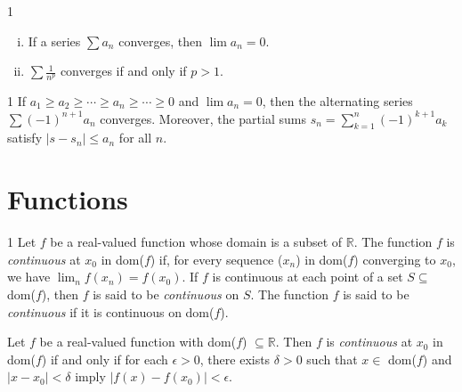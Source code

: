 \newpage

\begin{theo}{1}
	\begin{enumerate}[(i)]
		\item If a series $\sum a_n$ converges, then $\lim a_n = 0$. 
		\item $\sum \frac{1}{n^p}$ converges if and only if $p > 1$. 
	\end{enumerate}
\end{theo}



\begin{theo}{1}
	If $a_1 \geq a_2 \geq \cdots \geq a_n \geq \cdots \geq 0$ and $\lim a_n =0$, then the alternating series $\sum(-1)^{n+1}a_n$ converges. Moreover, the partial sums $s_n = \sum_{k=1}^{n}(-1)^{k+1}a_k$ satisfy $|s-s_n|\leq a_n$ for all $n$.
\end{theo}

\section{Functions}

\begin{defn}{1}
	Let $f$ be a real-valued function whose domain is a subset of $\mathbb{R}$. The function $f$ is \textit{continuous} at $x_0$ in dom($f$) if, for every sequence ($x_n$)	in dom($f$) converging to $x_0$, we have $\lim_n f(x_n) = f(x_0)$. If $f$ is continuous at each point of a set $S \subseteq$ dom($f$), then $f$ is said to	be \textit{continuous} on $S$. The function $f$ is said to be \textit{continuous} if it is continuous on dom($f$).
\end{defn}

\begin{theo}{1}
	Let $f$ be a real-valued function with dom($f$) $\subseteq \mathbb{R}$. Then
	$f$ is \textit{continuous} at $x_0$ in dom($f$) if and only if for each $\epsilon > 0$, there exists $\delta > 0$ such that $x\in$ dom($f$) and $|x-x_0|<\delta$ imply $|f(x)-f(x_0)|<\epsilon$.
\end{theo}

